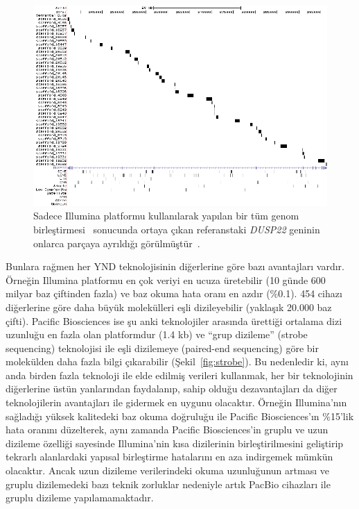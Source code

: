\documentclass[11pt]{article}
\begin{document}
\begin{figure}[htb]
\begin{center}
  \includegraphics[scale=0.45]{shatter.png}
\end{center}
\caption{Sadece Illumina platformu kullanılarak yapılan bir tüm genom birleştirmesi~\cite{Li2010b} sonucunda ortaya çıkan referanstaki {\it DUSP22} geninin onlarca parçaya ayrıldığı görülmüştür~\cite{Alkan2011b}.}
\label{fig:shatter}
\end{figure}



Bunlara rağmen her YND teknolojisinin diğerlerine göre bazı avantajları vardır. Örneğin Illumina platformu en çok veriyi en ucuza üretebilir (10 günde 600 milyar baz çiftinden fazla) ve baz okuma hata oranı en azdır (\%0.1). 454 cihazı diğerlerine göre daha büyük molekülleri eşli dizileyebilir (yaklaşık 20.000 baz çifti). Pacific Biosciences ise şu anki teknolojiler arasında ürettiği ortalama dizi uzunluğu en fazla olan platformdur (1.4 kb) ve ``grup dizileme'' (strobe sequencing) teknolojisi ile eşli dizilemeye (paired-end sequencing) göre bir molekülden daha fazla bilgi çıkarabilir (Şekil~\ref{fig:strobe}). Bu nedenledir ki, aynı anda birden fazla teknoloji ile elde edilmiş verileri kullanmak, her bir teknolojinin diğerlerine üstün yanlarından faydalanıp, sahip olduğu dezavantajları da diğer teknolojilerin avantajları ile gidermek en uygunu olacaktır. Örneğin Illumina'nın sağladığı yüksek kalitedeki baz okuma doğruluğu ile Pacific Biosciences'ın \%15'lik hata oranını düzelterek, aynı zamanda Pacific Biosciences'in gruplu ve uzun dizileme özelliği sayesinde Illumina'nin kısa dizilerinin birleştirilmesini geliştirip tekrarlı alanlardaki yapısal birleştirme hatalarını en aza indirgemek mümkün olacaktır.
Ancak uzun dizileme verilerindeki okuma uzunluğunun artması ve gruplu dizilemedeki bazı teknik zorluklar nedeniyle artık PacBio cihazları ile gruplu dizileme yapılamamaktadır.
\end{document}
